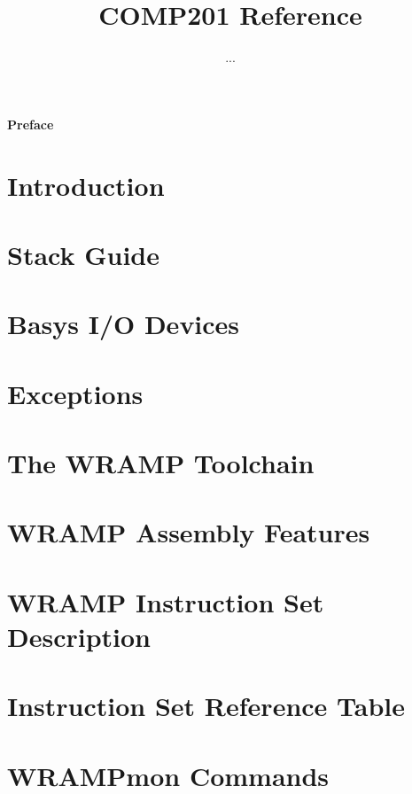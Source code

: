 \documentclass[a4paper]{book}
\title{COMP201 Reference}
\author{...}
\begin{document}

\begin{Huge}
\vspace{2cm}
\textbf{Preface}\\
\vspace{1.5cm}
\end{Huge}



\tableofcontents

\chapter{Introduction}
\label{chapter:intro}

\chapter{Stack Guide}
\label{chapter:stack}

\chapter{Basys I/O Devices}
\label{chapter:io}

\chapter{Exceptions}
\label{chapter:exceptions}

\appendix
\chapter{The WRAMP Toolchain}
\label{appendix:wasm-wlink}

\chapter{WRAMP Assembly Features}
\label{appendix:wramp-assembly}
\chapter{WRAMP Instruction Set Description}
\label{appendix:instr}

\chapter{Instruction Set Reference Table}
\label{appendix:instrsm}
\addtolength{\hoffset}{-1cm}
\addtolength{\textwidth}{1cm}

\chapter{WRAMPmon Commands}
\label{appendix:wrampmon}

\end{document}

